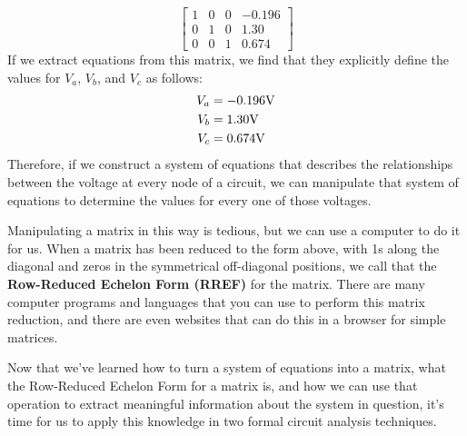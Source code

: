 $$
\begin{bmatrix}
    1   & 0 & 0 & -0.196 \\
    0  & 1 & 0 & 1.30 \\
    0   & 0 & 1 & 0.674
\end{bmatrix} 
$$
If we extract equations from this matrix, we find that they explicitly define the values for $V_a$, $V_b$, and $V_c$ as follows:
\begin{align*}
V_a &= -0.196\textnormal{V} \\
V_b &= 1.30\textnormal{V} \\
V_c &= 0.674\textnormal{V}
\end{align*}
Therefore, if we construct a system of equations that describes the relationships between the voltage at every node of a circuit, we can manipulate that system of equations to determine the values for every one of those voltages.
\par
Manipulating a matrix in this way is tedious, but we can use a computer to do it for us. When a matrix has been reduced to the form above, with 1s along the diagonal and zeros in the symmetrical off-diagonal positions, we call that the \textbf{Row-Reduced Echelon Form (RREF)} for the matrix. There are many computer programs and languages that you can use to perform this matrix reduction, and there are even websites that can do this in a browser for simple matrices.
\par
Now that we've learned how to turn a system of equations into a matrix, what the Row-Reduced Echelon Form for a matrix is, and how we can use that operation to extract meaningful information about the system in question, it's time for us to apply this knowledge in two formal circuit analysis techniques.

